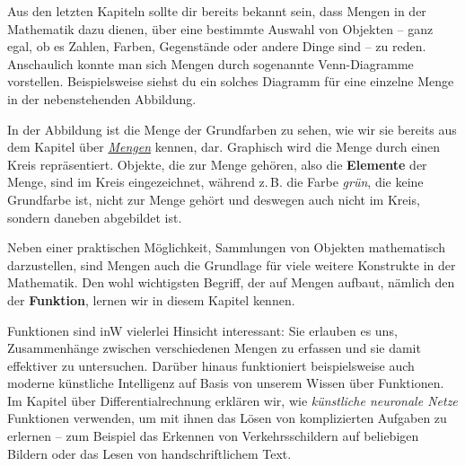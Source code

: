 \documentclass[../../main.tex]{subfiles}
\begin{document}
\label{sec:abbildungen_intuition}
Aus den letzten Kapiteln sollte dir bereits bekannt sein, dass Mengen in der Mathematik dazu dienen, über eine bestimmte Auswahl von Objekten -- ganz egal, ob es Zahlen, Farben, Gegenstände oder andere Dinge sind -- zu reden. Anschaulich konnte man sich Mengen durch sogenannte Venn-Diagramme vorstellen. Beispielsweise siehst du ein solches Diagramm für eine einzelne Menge in der nebenstehenden Abbildung.


In der Abbildung ist die Menge der Grundfarben zu sehen, wie wir sie bereits aus dem Kapitel über \href{ch:mengen}{\emph{Mengen}} kennen, dar. Graphisch wird die Menge durch einen Kreis repräsentiert. Objekte, die zur Menge gehören, also die \textbf{Elemente} der Menge, sind im Kreis eingezeichnet, während z.\,B. die Farbe \emph{grün}, die keine Grundfarbe ist, nicht zur Menge gehört und deswegen auch nicht im Kreis, sondern daneben abgebildet ist.

Neben einer praktischen Möglichkeit, Sammlungen von Objekten mathematisch darzustellen, sind Mengen auch die Grundlage für viele weitere Konstrukte in der Mathematik. Den wohl wichtigsten Begriff, der auf Mengen aufbaut, nämlich den der \textbf{Funktion}, lernen wir in diesem Kapitel kennen.

Funktionen sind inW vielerlei Hinsicht interessant: Sie erlauben es uns, Zusammenhänge zwischen verschiedenen Mengen zu erfassen und sie damit effektiver zu untersuchen. Darüber hinaus funktioniert beispielsweise auch moderne künstliche Intelligenz auf Basis von unserem Wissen über Funktionen. Im Kapitel über Differentialrechnung erklären wir, wie \emph{künstliche neuronale Netze} Funktionen verwenden, um mit ihnen das Lösen von komplizierten Aufgaben zu erlernen -- zum Beispiel das Erkennen von Verkehrsschildern auf beliebigen Bildern oder das Lesen von handschriftlichem Text.
\end{document}
